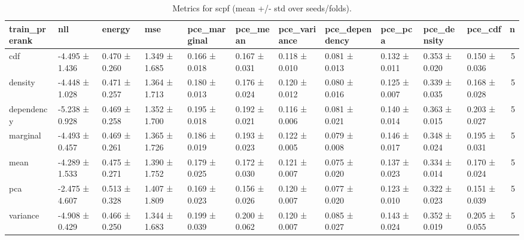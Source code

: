 \begin{table}
\caption{Metrics for scpf (mean +/- std over seeds/folds).}
\label{tab:metrics_summary_scpf}
\begin{tabular}{lllllllllllr}
\toprule
train_prerank & nll & energy & mse & pce_marginal & pce_mean & pce_variance & pce_dependency & pce_pca & pce_density & pce_cdf & n \\
\midrule
cdf & -4.495 ± 1.436 & 0.470 ± 0.260 & 1.349 ± 1.685 & 0.166 ± 0.018 & 0.167 ± 0.031 & 0.118 ± 0.010 & 0.081 ± 0.013 & 0.132 ± 0.011 & 0.353 ± 0.020 & 0.150 ± 0.036 & 5 \\
density & -4.448 ± 1.028 & 0.471 ± 0.257 & 1.364 ± 1.713 & 0.180 ± 0.013 & 0.176 ± 0.024 & 0.120 ± 0.012 & 0.080 ± 0.016 & 0.125 ± 0.007 & 0.339 ± 0.035 & 0.168 ± 0.028 & 5 \\
dependency & -5.238 ± 0.928 & 0.469 ± 0.258 & 1.352 ± 1.700 & 0.195 ± 0.018 & 0.192 ± 0.021 & 0.116 ± 0.006 & 0.081 ± 0.021 & 0.140 ± 0.014 & 0.363 ± 0.015 & 0.203 ± 0.027 & 5 \\
marginal & -4.493 ± 0.457 & 0.469 ± 0.261 & 1.365 ± 1.726 & 0.186 ± 0.019 & 0.193 ± 0.023 & 0.122 ± 0.005 & 0.079 ± 0.008 & 0.146 ± 0.017 & 0.348 ± 0.024 & 0.195 ± 0.031 & 5 \\
mean & -4.289 ± 1.533 & 0.475 ± 0.271 & 1.390 ± 1.752 & 0.179 ± 0.025 & 0.172 ± 0.030 & 0.121 ± 0.007 & 0.075 ± 0.020 & 0.137 ± 0.023 & 0.334 ± 0.014 & 0.170 ± 0.024 & 5 \\
pca & -2.475 ± 4.607 & 0.513 ± 0.328 & 1.407 ± 1.809 & 0.169 ± 0.023 & 0.156 ± 0.026 & 0.120 ± 0.007 & 0.077 ± 0.020 & 0.123 ± 0.010 & 0.322 ± 0.023 & 0.151 ± 0.039 & 5 \\
variance & -4.908 ± 0.429 & 0.466 ± 0.250 & 1.344 ± 1.683 & 0.199 ± 0.039 & 0.200 ± 0.062 & 0.120 ± 0.007 & 0.085 ± 0.027 & 0.143 ± 0.024 & 0.352 ± 0.019 & 0.205 ± 0.055 & 5 \\
\bottomrule
\end{tabular}
\end{table}
